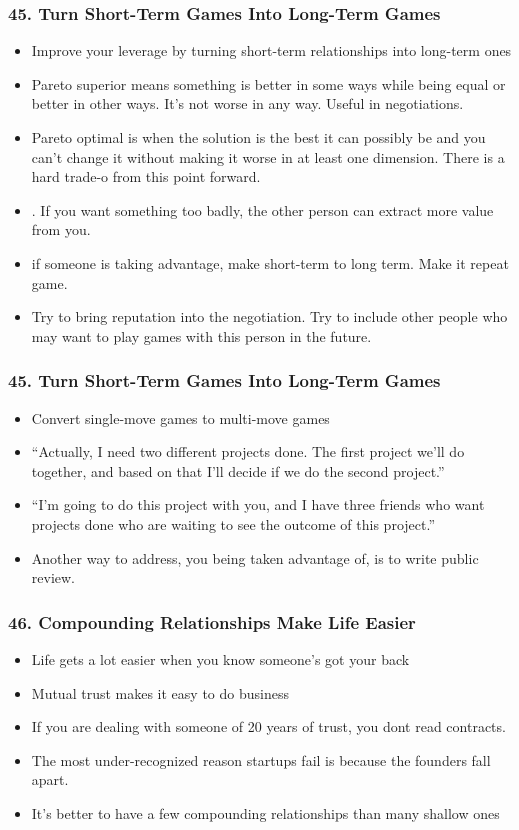 \begin{frame}[fragile]
\frametitle{45. Turn Short-Term Games Into Long-Term Games}
\begin{itemize}
\item Improve your leverage by turning short-term relationships into long-term ones
\item Pareto superior means something is better in some ways while being equal or better in other ways. It’s
not worse in any way. Useful in negotiations.
\item Pareto optimal is when the solution is the best it can possibly be and you can’t change it without making
it worse in at least one dimension. There is a hard trade-o  from this point forward.
\item . If you want something too badly, the other person can extract more value from you.
\item if someone is taking advantage, make short-term to long term. Make it repeat game.
\item  Try to bring reputation into the negotiation.
Try to include other people who may want to play games with this person in the future.
\end{itemize}
\end{frame}

\begin{frame}[fragile]
\frametitle{45. Turn Short-Term Games Into Long-Term Games}
\begin{itemize}
\item Convert single-move games to multi-move games
\item  “Actually, I need two different projects done. The  first project we’ll do
together, and based on that I’ll decide if we do the second project.”
\item  “I’m going to do this project with you, and I have three friends who want projects
done who are waiting to see the outcome of this project.”
\item Another way to address, you being taken advantage of, is to write public review.
\end{itemize}
\end{frame}


\begin{frame}[fragile]
\frametitle{46. Compounding Relationships Make Life Easier}
\begin{itemize}
\item Life gets a lot easier when you know someone’s got your back
\item Mutual trust makes it easy to do business
\item If you are dealing with someone of 20 years of trust, you dont read contracts.
\item The most under-recognized reason startups fail is because the founders fall apart.
\item It’s better to have a few compounding relationships than many shallow ones
\end{itemize}
\end{frame}

